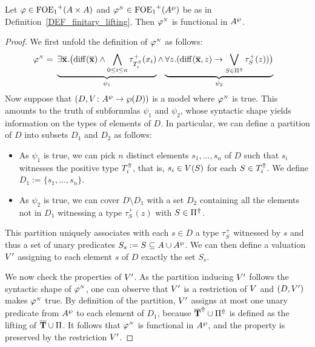 \begin{lemma}\label{LEM_cont}
Let $\varphi \in {\ensuremath{\mathrm{FOE}_1}}^+(A \times A)$ and $\varphi^{{\scriptscriptstyle N}}\in {\ensuremath{\mathrm{FOE}_1}}^+(A^{\wp} )$ be as in Definition~\ref{DEF_finitary_lifting}. Then $\varphi^{{\scriptscriptstyle N}}$ is functional in $A^{\wp}$.
 \end{lemma}

\begin{proof}
We first unfold the definition of $\varphi^{{\scriptscriptstyle N}}$ as follows:
\begin{align*}
\varphi^{{\scriptscriptstyle N}} =\ &
\underbrace{
    \exists \overline{{\mathbf{x}}}.\big(\mathrm{diff}(\overline{{\mathbf{x}}}) \land \bigwedge_{0 \leq i \leq n} \tau^+_{T^{\Uparrow}_i}(x_i)
}_{\psi_1}
\land \underbrace{
    \forall z.(\mathrm{diff}(\overline{{\mathbf{x}}},z) \to \bigvee_{S\in \Pi^{\Uparrow}} \tau^+_S(z))\big)
}_{\psi_2}
\end{align*}
Now suppose that $(D,V \colon A^{\wp} \to \wp(D))$ is a model where $\varphi^{{\scriptscriptstyle N}}$ is true. This amounts to the truth of subformulas $\psi_1$ and $\psi_2$, whose syntactic shape yields information on the types of elements of $D$. In particular, we can define a partition of $D$ into subsets $D_1$ and $D_2$ as follows:
\begin{itemize}
  \item As $\psi_1$ is true, we can pick $n$ distinct elements $s_1,\dots,s_n$ of $D$ such that $s_i$ witnesses the positive type $T^{\Uparrow}_i$, %
   that is, $s_i \in V(S)$ for each $S \in T^{\Uparrow}_i$. We define $D_1 := \{s_1,\dots,s_n\}$.
  \item  As $\psi_2$ is true, we can cover $D \setminus D_1$ with a set $D_2$ containing all the elements not in $D_1$ witnessing a type ${\tau}^{+}_S(z)$ with $S \in  \Pi^{\Uparrow}$. 
 \end{itemize}
This partition uniquely associates with each $s \in D$ a type ${\tau}^{+}_S$ witnessed by $s$ and thus a set of unary predicates $S_s := S \subseteq A \cup A^{\wp}$. We can then define a valuation $V'$ assigning to each element $s$ of $D$ exactly the set $S_s$.

We now check the properties of $V'$. As the partition inducing $V'$ follows the syntactic shape of $\varphi^{{\scriptscriptstyle N}}$, one can observe that $V'$ is a restriction of $V$ and $(D,V')$ makes $\varphi^{{\scriptscriptstyle N}}$ true. By definition of the partition, $V'$ assigns at most one unary predicate from $A^{\wp}$ to each element of $D_1$, because $\overline{{\mathbf{T}}}^{\Uparrow} \cup \Pi^{\Uparrow}$ is defined as the lifting of $\overline{{\mathbf{T}}} \cup \Pi$. It follows that $\varphi^{{\scriptscriptstyle N}}$ is functional in $A^{\wp}$, and the property is preserved by the restriction $V'$.
\end{proof}


